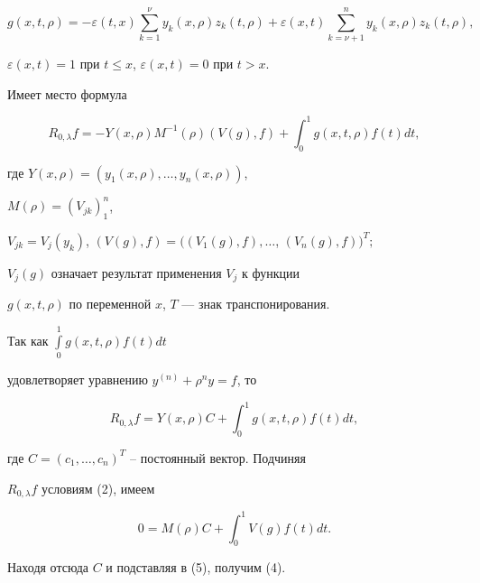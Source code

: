 $$


g(x,t,\rho)=-\varepsilon(t,x)\sum\limits_{k=1}^{\nu}y_k(x,\rho)z_k


(t,\rho)+\varepsilon(x,t)\sum\limits_{k=\nu+1}^ny_k(x,\rho)


z_k(t,\rho),


$$


$\varepsilon(x,t)=1$ при $t\le x$, $\varepsilon(x,t)=0$ при $t>x$.





\begin{lem}


Имеет место формула


\begin{equation}


R_{0,\lambda} f=-Y(x,\rho)M^{-1}(\rho)(V(g),f)+\int_0^1g


(x,t,\rho)f(t)dt,


\end{equation}


где $Y(x,\rho)=(y_1(x,\rho),\dotsc,y_n(x,\rho))$,


$M(\rho)=(V_{jk})_1^n$,


$V_{jk}=V_j(y_k)$, $(V(g),f)=((V_1(g),f),\dotsc$, $(V_n(g),f))^T;$


$V_j(g)$ означает результат применения $V_j$ к функции


$g(x,t,\rho)$ по переменной $x$, $T$ --- знак транспонирования.


\end{lem}





\begin{pf}


Так как $\int\limits_0^1g(x,t,\rho)f(t)dt$


удовлетворяет уравнению $y^{(n)}+\rho^ny=f$, то


\begin{equation}


R_{0,\lambda}f=Y(x,\rho)C+\int_0^1g(x,t,\rho)f(t)dt,


\end{equation}


где $C=(c_1,\dotsc,c_n)^T$ -- постоянный вектор. Подчиняя


$R_{0,\lambda} f$ условиям (2), имеем


$$


0=M(\rho)C+\int_0^1V(g)f(t)dt.


$$


Находя отсюда $C$ и подставляя в (5), получим (4).


\end{pf}





